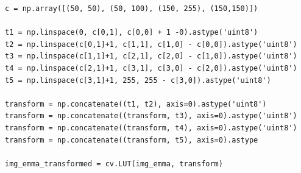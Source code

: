 \documentclass[11pt]{article}
\begin{document}
\begin{lstlisting}[style=pythonstyle]
c = np.array([(50, 50), (50, 100), (150, 255), (150,150)])

t1 = np.linspace(0, c[0,1], c[0,0] + 1 -0).astype('uint8')
t2 = np.linspace(c[0,1]+1, c[1,1], c[1,0] - c[0,0]).astype('uint8')
t3 = np.linspace(c[1,1]+1, c[2,1], c[2,0] - c[1,0]).astype('uint8')
t4 = np.linspace(c[2,1]+1, c[3,1], c[3,0] - c[2,0]).astype('uint8')
t5 = np.linspace(c[3,1]+1, 255, 255 - c[3,0]).astype('uint8')

transform = np.concatenate((t1, t2), axis=0).astype('uint8')
transform = np.concatenate((transform, t3), axis=0).astype('uint8')
transform = np.concatenate((transform, t4), axis=0).astype('uint8')
transform = np.concatenate((transform, t5), axis=0).astype

img_emma_transformed = cv.LUT(img_emma, transform)
\end{lstlisting}
\end{document}
